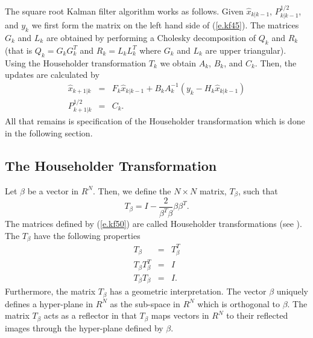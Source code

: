 	The square root Kalman filter algorithm
works as follows.  Given $\hat{x}_{k|k-1}$, $P_{k|k-1}^{1/2}$, and
$y_k$ we first form the matrix on the left hand side of (\ref{e.kf45}).
The  matrices $G_k$ and $L_k$ are obtained by performing
a Cholesky decomposition of $Q_k$ and $R_k$ (that is $Q_k=G_kG_k^T$
and $R_k=L_kL_k^T$ where $G_k$ and $L_k$ are upper triangular).
Using the Householder transformation $T_k$ we obtain $A_k$, $B_k$,
and $C_k$.  Then, the updates are calculated by
%
\begin{eqnarray}
\hat{x}_{k+1|k}&=&F_k\hat{x}_{k|k-1}+B_kA_k^{-1}(y_k-H_k\hat{x}_{k|k-1})\nonumber\\
P_{k+1|k}^{1/2}&=&C_k.
\label{e.kf51}
\end{eqnarray}
%
All that remains is specification of the Householder transformation
which is done in the following section.

\subsection{The Householder Transformation}

	Let $\beta$ be a vector in $R^N$.  Then, we
define the $N\times N$ matrix, $T_{\beta}$, such that
%
\begin{equation}
T_{\beta}=I-\frac{2}{\beta^T\beta}\beta\beta^T.
\label{e.kf50a}
\end{equation}
%
The matrices defined by (\ref{e.kf50}) are called Householder 
transformations (see \cite{Stewart}).
The $T_{\beta}$ have the following properties
%
\begin{eqnarray}
T_{\beta}&=&T_{\beta}^T\nonumber\\
T_{\beta}T_{\beta}^T&=&I\nonumber\\
T_{\beta}T_{\beta}&=&I.
\label{e.kf51a}
\end{eqnarray}
%
Furthermore, the matrix $T_{\beta}$ has a geometric interpretation.
The vector $\beta$ uniquely defines a hyper-plane
in $R^N$ as the sub-space in $R^N$ which is orthogonal to $\beta$.
The matrix $T_{\beta}$ acts as a reflector in that $T_{\beta}$ maps
vectors in $R^N$ to their reflected images through the
hyper-plane defined by $\beta$.

